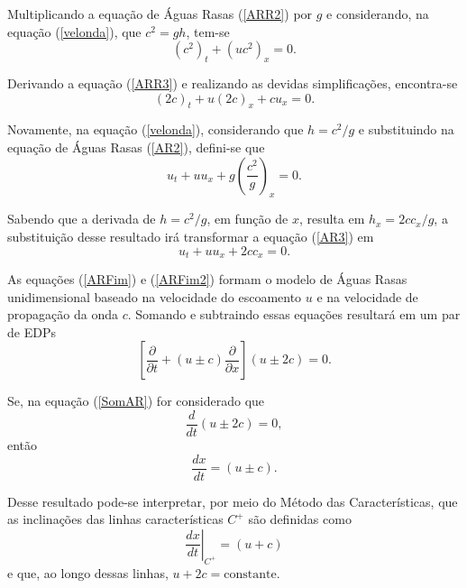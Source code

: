 Multiplicando a equação de Águas Rasas (\ref{ARR2}) por $g$ e considerando, na equação (\ref{velonda}), que $c^2 = gh$, tem-se
\begin{equation} \label{ARR3}
(c^2)_t + (uc^2)_x = 0.
\end{equation} 

Derivando a  equação (\ref{ARR3}) e realizando as devidas simplificações, encontra-se
\begin{equation} \label{ARFim}
(2c)_t + u(2c)_x + cu_x = 0.
\end{equation}

Novamente, na  equação (\ref{velonda}), considerando que $h = {c^2}/{g}$ e substituindo na equação de Águas Rasas (\ref{AR2}), defini-se que
\begin{equation}\label{AR3}
u_t +uu_x + g \left( \frac{c^2}{g} \right)_x= 0.
\end{equation}

Sabendo que a derivada de $h = {c^2}/{g}$, em função de $x$, resulta em $h_x = 2cc_x /g$, a substituição desse resultado irá transformar a equação (\ref{AR3}) em
\begin{equation} \label{ARFim2}
u_t + uu_x + 2cc_x = 0.
\end{equation}

As equações (\ref{ARFim}) e (\ref{ARFim2}) formam o modelo de Águas Rasas unidimensional baseado na velocidade do escoamento $u$ e na velocidade de propagação da onda $c$. Somando e subtraindo essas equações resultará em um par de EDPs
\begin{equation}\label{SomAR}
\left[ \frac{ \partial}{ \partial t} + (u \pm c) \frac{ \partial}{ \partial x} \right](u \pm 2c) =0.
\end{equation}

Se, na equação (\ref{SomAR}) for considerado que
\begin{equation*}
\frac{d}{dt}(u \pm 2c) = 0,
\end{equation*}
então
\begin{equation*}
\frac{dx}{dt} = (u \pm c).
\end{equation*}

Desse resultado pode-se interpretar, por meio do Método das Características, que as inclinações das linhas características $ C^+ $ são definidas como
\begin{equation*}
\left. \frac{dx}{dt} \right|_{C^+} = (u + c)
\end{equation*}
e que, ao longo dessas linhas, $u + 2c = \text{constante}$.

